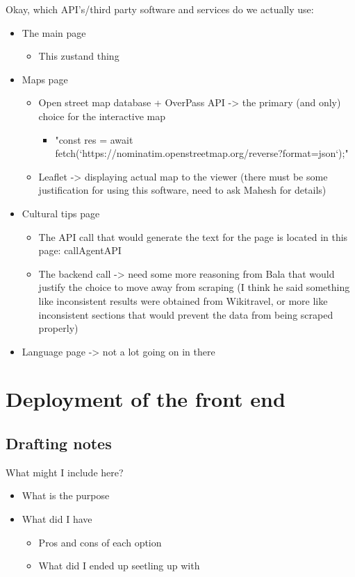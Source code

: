 Okay, which API's/third party software and services do we actually use:
\begin{itemize}
    \item The main page
    \begin{itemize}
        \item This zustand thing
    \end{itemize}
    \item Maps page
    \begin{itemize}
        \item Open street map database + OverPass API -> the primary (and only) choice for the interactive map 
        \begin{itemize}
            \item "const res = await fetch(`https://nominatim.openstreetmap.org/reverse?format=json`);"
        \end{itemize}
        \item Leaflet -> displaying actual map to the viewer (there must be some justification for using this software, need to ask Mahesh for details)
    \end{itemize}
    \item Cultural tips page
    \begin{itemize}
        \item The API call that would generate the text for the page is located in this page: callAgentAPI
        \item The backend call -> need some more reasoning from Bala that would justify the choice to move away from scraping (I think he said something like inconsistent results were obtained from Wikitravel, or more like inconsistent sections that would prevent the data from being scraped properly)
    \end{itemize}
    \item Language page -> not a lot going on in there
\end{itemize}




\section{Deployment of the front end}
\subsection{Drafting notes}
What might I include here?
\begin{itemize}
    \item What is the purpose
    \item What did I have
    \begin{itemize}
        \item Pros and cons of each option
        \item What did I ended up seetling up with
    \end{itemize}
\end{itemize}

